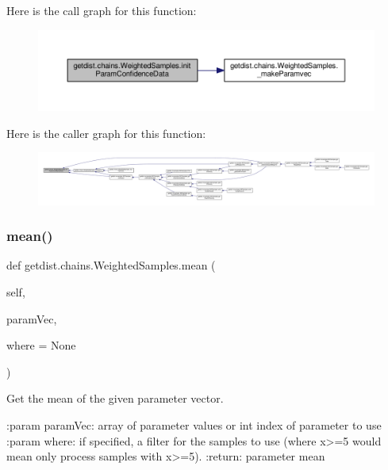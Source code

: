 Here is the call graph for this function\+:
\nopagebreak
\begin{figure}[H]
\begin{center}
\leavevmode
\includegraphics[width=350pt]{classgetdist_1_1chains_1_1WeightedSamples_af09edaafcc644533d7c24107f2daec81_cgraph}
\end{center}
\end{figure}
Here is the caller graph for this function\+:
\nopagebreak
\begin{figure}[H]
\begin{center}
\leavevmode
\includegraphics[width=350pt]{classgetdist_1_1chains_1_1WeightedSamples_af09edaafcc644533d7c24107f2daec81_icgraph}
\end{center}
\end{figure}
\mbox{\label{classgetdist_1_1chains_1_1WeightedSamples_a72a6f011746d852ea089302d90f59159}} 
\subsubsection{\texorpdfstring{mean()}{mean()}}
{\footnotesize\ttfamily def getdist.\+chains.\+Weighted\+Samples.\+mean (\begin{DoxyParamCaption}\item[{}]{self,  }\item[{}]{param\+Vec,  }\item[{}]{where = {\ttfamily None} }\end{DoxyParamCaption})}

\begin{DoxyVerb}Get the mean of the given parameter vector.

:param paramVec: array of parameter values or int index of parameter to use
:param where: if specified, a filter for the samples to use (where x>=5 would mean only process samples with x>=5).
:return: parameter mean
\end{DoxyVerb}
 

